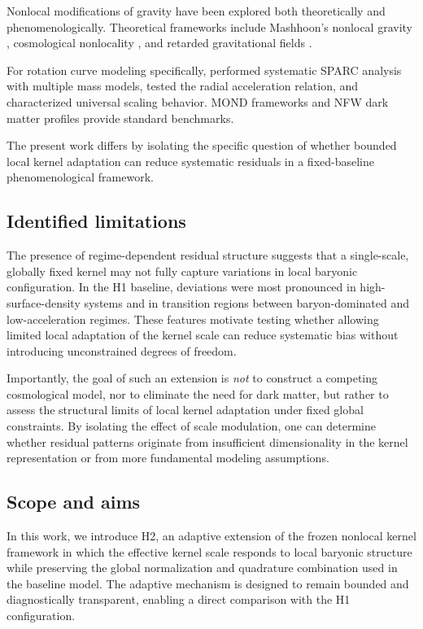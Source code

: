 \documentclass[twocolumn,linenumbers]{aastex701}
\begin{document}
Nonlocal modifications of gravity have been explored both theoretically
and phenomenologically. Theoretical frameworks include Mashhoon's nonlocal
gravity \citep{mashhoon2007,hehl2009}, cosmological nonlocality
\citep{deser2007,deffayet2009}, and retarded gravitational fields
\citep{chicone2016}.

For rotation curve modeling specifically, \citet{li2018} performed
systematic SPARC analysis with multiple mass models, \citet{rodrigues2018}
tested the radial acceleration relation, and \citet{lelli2017} characterized
universal scaling behavior. MOND frameworks \citep{milgrom1983,famaey2012}
and NFW dark matter profiles \citep{nfw1997} provide standard benchmarks.

The present work differs by isolating the specific question of whether
bounded local kernel adaptation can reduce systematic residuals in a
fixed-baseline phenomenological framework.

\subsection{Identified limitations}

The presence of regime-dependent residual structure suggests that a
single-scale, globally fixed kernel may not fully capture variations in
local baryonic configuration. In the H1 baseline, deviations were most
pronounced in high-surface-density systems and in transition regions between
baryon-dominated and low-acceleration regimes. These features motivate
testing whether allowing limited local adaptation of the kernel scale can
reduce systematic bias without introducing unconstrained degrees of freedom.

Importantly, the goal of such an extension is \emph{not} to construct a
competing cosmological model, nor to eliminate the need for dark matter,
but rather to assess the structural limits of local kernel adaptation under
fixed global constraints. By isolating the effect of scale modulation, one
can determine whether residual patterns originate from insufficient
dimensionality in the kernel representation or from more fundamental
modeling assumptions.

\subsection{Scope and aims}

In this work, we introduce H2, an adaptive extension of the frozen nonlocal
kernel framework in which the effective kernel scale responds to local
baryonic structure while preserving the global normalization and quadrature
combination used in the baseline model. The adaptive mechanism is designed
to remain bounded and diagnostically transparent, enabling a direct
comparison with the H1 configuration.
\end{document}
